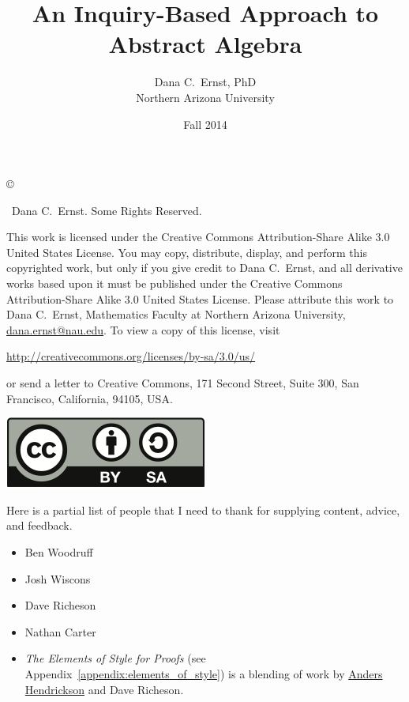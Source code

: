 \documentclass[12pt,oneside]{book}
\theoremstyle{definition}
\begin{document}
\title{An Inquiry-Based Approach to Abstract Algebra}
\author{Dana C.~Ernst, PhD\\
Northern Arizona University}
\date{Fall 2014}

\maketitle
\thispagestyle{empty}

\noindent\copyright{ \the\year\ Dana C.~Ernst.  Some Rights Reserved.\\

\bigskip

\noindent This work is licensed under the Creative Commons Attribution-Share Alike 3.0 United States License.  You may copy, distribute, display, and perform this copyrighted work, but only if you give credit to Dana C.~Ernst, and all derivative works based upon it must be published under the Creative Commons Attribution-Share Alike 3.0 United States License. Please attribute this work to Dana C.~Ernst, Mathematics Faculty at Northern Arizona University, \url{dana.ernst@nau.edu}. To view a copy of this license, visit
\begin{center}
\url{http://creativecommons.org/licenses/by-sa/3.0/us/}
\end{center}
or send a letter to Creative Commons, 171 Second Street, Suite 300, San Francisco, California, 94105, USA.}

\bigskip

\begin{center}
\includegraphics{by-sa.png}
\end{center}

\noindent Here is a partial list of people that I need to thank for supplying content, advice, and feedback.
\begin{itemize}
\item Ben Woodruff
\item Josh Wiscons
\item Dave Richeson
\item Nathan Carter
\item \emph{The Elements of Style for Proofs} (see Appendix~\ref{appendix:elements_of_style}) is a blending of work by \href{http://home.snc.edu/andershendrickson/}{Anders Hendrickson} and Dave Richeson.
\end{itemize}

\tableofcontents
\thispagestyle{empty}

%





%
%
%
%
%
%
%
\end{document}
